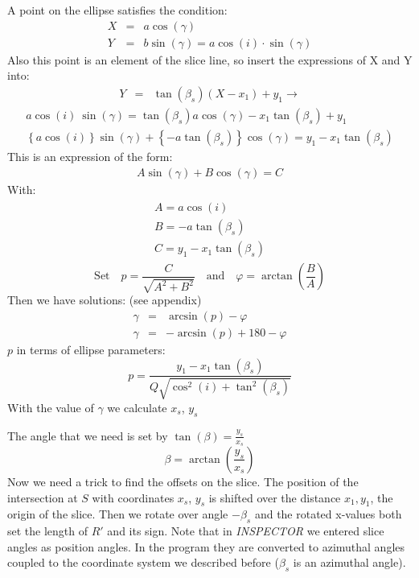 \documentclass[11pt,a4paper]{article}
\newcommand{\sinb}[1]{\sin \left( #1 \right)}
\newcommand{\cosb}[1]{\cos \left( #1 \right)}
\newcommand{\tanb}[1]{\tan \left( #1 \right)}
\newcommand{\asinb}[1]{\arcsin \left( #1 \right)}
\newcommand{\atanb}[1]{\arctan \left( #1 \right)}
\begin{document}
A point on the ellipse satisfies the condition:
\begin{eqnarray}
X &=& a \cos (\gamma)\\
Y &=& b \sin (\gamma) = a \cos (i)\cdot \sin (\gamma)
\end{eqnarray}
Also this point is an element of the slice line, so insert the expressions 
of X and Y into:
\begin{eqnarray}
Y &=& \tan (\beta_{s})(X-x_{1}) + y_1 \to
\end{eqnarray}
\begin{eqnarray}
a\cosb{i} \  \sinb{\gamma} = \tan (\beta_{s}) a \cos (\gamma) - x_{1} \tan (\beta_{s}) + y_{1}\\
\left\{ a \cosb{i}\right\} \sin (\gamma) +  \left\{-a \tan (\beta_{s})\right\} \cos (\gamma) = y_{1} - x_{1} \tan(\beta_{s})
\end{eqnarray}
This is an expression of the form:
\begin{eqnarray}
A\sinb{\gamma}+B\cosb{\gamma}=C
\end{eqnarray}
With:
\begin{eqnarray}
\begin{array}{l}
A=a\cosb{i} \\
B=-a\tanb{\beta_s} \\
C=y_1-x_1\tanb{\beta_s}
\end{array}
\end{eqnarray}
\begin{displaymath}
\mathrm{Set}\quad p=\frac{C}{\sqrt{A^2+B^2}} \quad \mathrm{and}\quad \varphi =\atanb{\frac{B}{A}}
\end{displaymath}
Then we have solutions: (see appendix)
\begin{eqnarray}
\gamma & = & \asinb{p}-\varphi\\
\gamma & = & -\asinb{p}+180-\varphi
\end{eqnarray}
$p$ in terms of ellipse parameters:
\begin{displaymath}
p=\frac{y_1-x_1\tanb{\beta_s}}{Q\sqrt{\cos^2 \left( i \right)+\tan^2 \left( \beta_s \right)}}
\end{displaymath}
With the value of $\gamma$ we calculate $x_s$, $y_s$
\pagebreak

The angle that we need is set by $\tan\left(\beta\right)=\frac{y_s}{x_s}$
$$\beta = \arctan\left(\frac{y_s}{x_s}\right)$$
Now we need a trick to find the offsets on the slice.
The position of the intersection at $S$ with coordinates $x_s$, $y_s$ is 
shifted over the distance $x_1,y_1$, the origin of the slice. 
Then we rotate over angle $-\beta_s$ and the rotated x-values both set 
the length of $R'$ and its sign. Note that in {\it INSPECTOR} we entered slice
angles as position angles. In the program they are converted to azimuthal 
angles coupled to the coordinate system we described before 
($\beta_s$ is an azimuthal angle).
\end{document}
